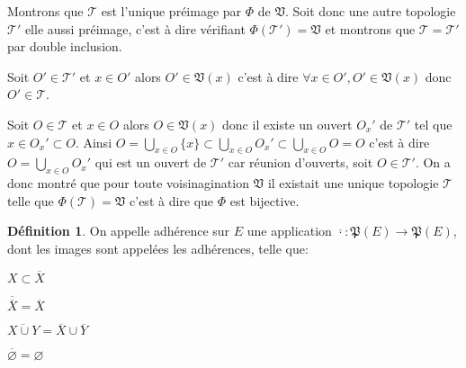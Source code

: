 \documentclass[a4paper, 11pt, french]{book}
\newenvironment{itemise}{\itemize}{\enditemize}
\theoremstyle{plain} %
\theoremstyle{definition} %
\newtheorem{definition}{Définition}
\theoremstyle{remark} %
\newcommand{\1}{\mathds{1}}
\newcommand\vide{\varnothing}
\begin{document}
Montrons que $\mathscr{T}$ est l'unique préimage par $\Phi$ de $\mathfrak{V}$.
Soit donc une autre topologie $\mathscr{T}'$ elle aussi préimage, c'est à dire vérifiant $\Phi(\mathscr{T}')=\mathfrak{V}$ et montrons que $\mathscr{T}=\mathscr{T}'$ par double inclusion.
\begin{itemise}
	\item Soit $O'\in\mathscr{T}'$ et $x\in O'$ alors $O'\in\mathfrak{V}(x)$ c'est à dire $\forall x\in O', O'\in\mathfrak{V}(x)$ donc $O'\in\mathscr{T}$.
	\item Soit $O\in\mathscr{T}$ et $x\in O$ alors $O\in\mathfrak{V}(x)$ donc il existe un ouvert $O_x'$ de $\mathscr{T}'$ tel que $x\in O_x'\subset O$.
	Ainsi $O=\bigcup_{x\in O}\{x\}\subset\bigcup_{x\in O}O_x'\subset\bigcup_{x\in O}O=O$ c'est à dire $O=\bigcup_{x\in O}O_x'$ qui est un ouvert de $\mathscr{T}'$ car réunion d'ouverts, soit $O\in\mathscr{T}'$.
\end{itemise}
On a donc montré que pour toute voisinagination $\mathfrak{V}$ il existait une unique topologie $\mathscr{T}$ telle que $\Phi(\mathscr{T})=\mathfrak{V}$ c'est à dire que $\Phi$ est bijective.

\begin{definition}
On appelle adhérence sur $E$ une application $\overline{\cdot}\colon\mathfrak{P}(E)\rightarrow\mathfrak{P}(E)$, dont les images sont appelées les adhérences, telle que:
\begin{itemise}
	\item $X\subset\overline{X}$
	\item $\overline{\overline{X}}=\overline{X}$
	\item $\overline{X\cup Y}=\overline{X}\cup\overline{Y}$
	\item $\overline{\vide}=\vide$
\end{itemise}
\end{definition}
\end{document}
